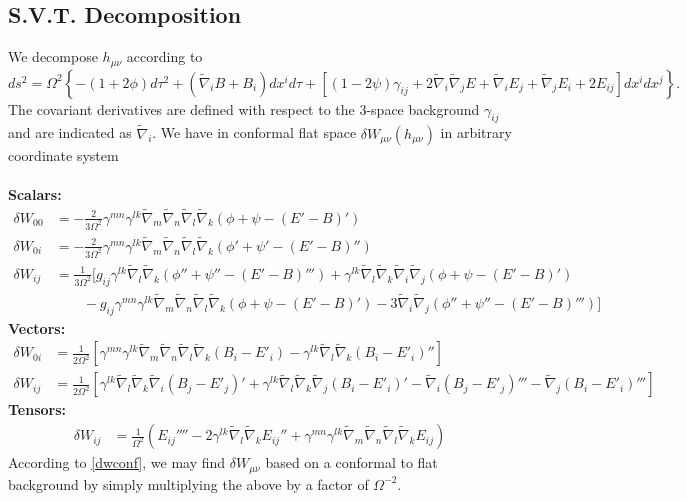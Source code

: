 \documentclass[10pt,letterpaper]{article}
\newcommand{\plr}[1]{\left(#1\right)} %
\newcommand{\clr}[1]{\left\{#1\right\}} %
\newcommand{\blr}[1]{\left[#1\right]} %
\newcommand{\be}{\begin{equation}} %
\newcommand{\ee}{\end{equation}} %
\newcommand{\del}{\nabla} %
\numberwithin{equation}{section}
\begin{document}
\subsection{S.V.T. Decomposition}
We decompose $h_{\mu\nu}$ according to 
\be
	ds^2 = \Omega^2\clr{ -(1+2\phi)d\tau^2 + (\tilde\del_i B+B_i)dx^id\tau + [(1-2\psi)\gamma_{ij}+2\tilde\del_i\tilde\del_j E + \tilde\del_i E_j+\tilde\del_j E_i + 2E_{ij}]dx^i dx^j}.
\ee
The covariant derivatives are defined with respect to the 3-space background $\gamma_{ij}$ and are indicated as $\tilde \del_i$. We have in conformal flat space $\delta W_{\mu\nu}(h_{\mu\nu})$ in arbitrary coordinate system
\\
\\
\textbf{Scalars:}
\begin{align}
	\delta W_{00} & = -\frac{2}{3\Omega^2} \gamma^{mn}\gamma^{lk}\tilde\del_m\tilde\del_n\tilde\del_l\tilde\del_k (\phi + \psi - (E'-B)')\\
	\delta W_{0i} &=  -\frac{2}{3\Omega^2} \gamma^{mn}\gamma^{lk}\tilde\del_m\tilde\del_n\tilde\del_l\tilde\del_k(\phi' + \psi' - (E'-B)'')\\
	\delta W_{ij} & = \frac{1}{3\Omega^2}\big[ g_{ij}\gamma^{lk}\tilde\del_l\tilde\del_k  (\phi'' + \psi'' - (E'-B)''') + \gamma^{lk}\tilde\del_l\tilde\del_k \tilde\del_i\tilde\del_j (\phi + \psi - (E'-B)') \\
	&\qquad - g_{ij} \gamma^{mn}\gamma^{lk}\tilde\del_m\tilde\del_n\tilde\del_l\tilde\del_k(\phi + \psi - (E'-B)') -3\tilde\del_i\tilde\del_j (\phi'' + \psi'' - (E'-B)''')\big]  \nonumber
\end{align}
\textbf{Vectors:}
\begin{align}
	\delta W_{0i} &=  \frac{1}{2\Omega^2}\blr{\gamma^{mn}\gamma^{lk}\tilde\del_m\tilde\del_n\tilde\del_l\tilde\del_k(B_i - E'_i) -  \gamma^{lk}\tilde\del_l\tilde\del_k (B_i - E'_i)''} \\
	\delta W_{ij} & = \frac{1}{2\Omega^2}\blr{  \gamma^{lk}\tilde\del_l\tilde\del_k \tilde\del_i   (B_j - E'_j)'+ \gamma^{lk}\tilde\del_l\tilde\del_k \tilde\del_j (B_i - E'_i)' - \tilde\del_i(B_j - E'_j)'''-\tilde\del_j(B_i - E'_i)'''}
\end{align}
\textbf{Tensors:}
\begin{align}
	\delta W_{ij} & = \frac{1}{\Omega^2}\plr{E_{ij}''''-2\gamma^{lk}\tilde\del_l\tilde\del_k E_{ij}''+\gamma^{mn}\gamma^{lk}\tilde\del_m\tilde\del_n\tilde\del_l\tilde\del_k E_{ij}}
\end{align}
\noindent According to \ref{dwconf}, we may find $\delta W_{\mu\nu}$ based on a conformal to flat background by simply multiplying the above by a factor of $\Omega^{-2}$. 
\end{document}
